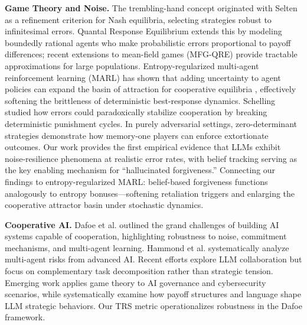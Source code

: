 \documentclass{uai2026} %
\begin{document}
\textbf{Game Theory and Noise.} The trembling-hand concept originated with Selten \citep{selten1975reexamination} as a refinement criterion for Nash equilibria, selecting strategies robust to infinitesimal errors. Quantal Response Equilibrium \citep{mckelvey1998quantal} extends this by modeling boundedly rational agents who make probabilistic errors proportional to payoff differences; recent extensions to mean-field games (MFG-QRE) provide tractable approximations for large populations. Entropy-regularized multi-agent reinforcement learning (MARL) has shown that adding uncertainty to agent policies can expand the basin of attraction for cooperative equilibria \citep{han2012alife}, effectively softening the brittleness of deterministic best-response dynamics. Schelling \citep{schelling1960strategy} studied how errors could paradoxically stabilize cooperation by breaking deterministic punishment cycles. In purely adversarial settings, zero-determinant strategies \citep{pressDyson2012,hilbe2013memory} demonstrate how memory-one players can enforce extortionate outcomes. Our work provides the first empirical evidence that LLMs exhibit noise-resilience phenomena at realistic error rates, with belief tracking serving as the key enabling mechanism for ``hallucinated forgiveness.'' Connecting our findings to entropy-regularized MARL: belief-based forgiveness functions analogously to entropy bonuses---softening retaliation triggers and enlarging the cooperative attractor basin under stochastic dynamics.

\textbf{Cooperative AI.} Dafoe et al. \citep{dafoe2020open} outlined the grand challenges of building AI systems capable of cooperation, highlighting robustness to noise, commitment mechanisms, and multi-agent learning. Hammond et al. \citep{hammond2025multi} systematically analyze multi-agent risks from advanced AI. Recent efforts \citep{zhang2023exploring,mao2023alympics,mao2025alympics} explore LLM collaboration but focus on complementary task decomposition rather than strategic tension. Emerging work \citep{buscemi2025llms,buscemi2025fairgame,proverbio2025can} applies game theory to AI governance and cybersecurity scenarios, while \citet{huynh2025understanding,huynh2026stake} systematically examine how payoff structures and language shape LLM strategic behaviors. Our TRS metric operationalizes robustness in the Dafoe framework.
\end{document}
